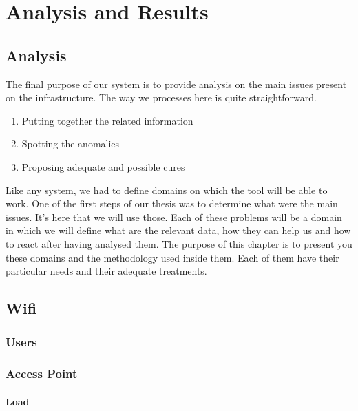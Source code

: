 
\chapter{Analysis and Results} %

\label{Chapter6} %


\section{Analysis}
The final purpose of our system is to provide analysis on the main issues present on the infrastructure. The way we processes here is quite straightforward.

\begin{enumerate}
\item Putting together the related information
\item Spotting the anomalies
\item Proposing adequate and possible cures
\end{enumerate}

Like any system, we had to define domains on which the tool will be able to work. One of the first steps of our thesis was to determine what were the main issues. It's here that we will use those. Each of these problems will be a domain in which we will define what are the relevant data, how they can help us and how to react after having analysed them. The purpose of this chapter is to present you these domains and the methodology used inside them. Each of them have their particular needs and their adequate treatments.

\section{Wifi}
\subsection{Users}
\subsection{Access Point}
\subsubsection*{Load}
